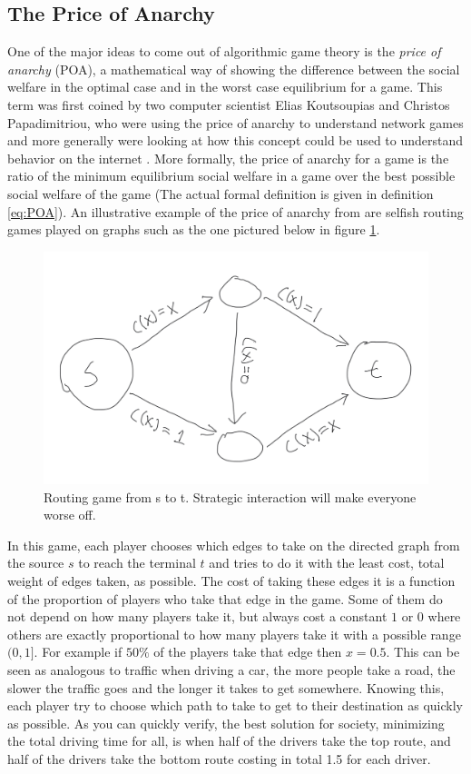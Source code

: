 \documentclass[12pt,twoside]{reedthesis}
\begin{document}
\subsection{The Price of Anarchy}
One of the major ideas to come out of algorithmic game theory is the \textit{price of anarchy} (POA), a mathematical way of showing the difference between the social welfare in the optimal case and in the worst case equilibrium for a game. This term was first coined by two computer scientist Elias Koutsoupias and Christos Papadimitriou, who were using the price of anarchy to understand network games and more generally were looking at how this concept could be used to understand behavior on the internet \citep*{Koutsoupias1999, Papadimitriou2001}. More formally, the price of anarchy for a game is the ratio of the minimum equilibrium social welfare in a game over the best possible social welfare of the game (The actual formal definition is given in definition \ref{eq:POA}). An illustrative example of the price of anarchy from \citet[15-16]{Roughgarden2016} are selfish routing games played on graphs such as the one pictured below in figure \ref{braess}. 
\begin{figure}[h!]
	\centering
	\includegraphics[scale=0.35]{Figures/braess}
	\caption{Routing game from s to t. Strategic interaction will make everyone worse off.}
	\label{braess}
\end{figure}
In this game, each player chooses which edges to take on the directed graph from the source $s$ to reach the terminal $t$ and tries to do it with the least cost, total weight of edges taken, as possible. The cost of taking these edges it is a function of the proportion of players who take that edge in the game. Some of them do not depend on how many players take it, but always cost a constant $1$ or $0$ where others are exactly proportional to how many players take it with a possible range $(0,1]$.
For example if $50 \%$ of the players take that edge then $x=0.5$. This can be seen as analogous to traffic when driving a car, the more people take a road, the slower the traffic goes and the longer it takes to get somewhere. Knowing this, each player try to choose which path to take to get to their destination as quickly as possible. As you can quickly verify, the best solution for society, minimizing the total driving time for all, is when half of the drivers take the top route, and half of the drivers take the bottom route costing in total 1.5 for each driver. 
\end{document}
